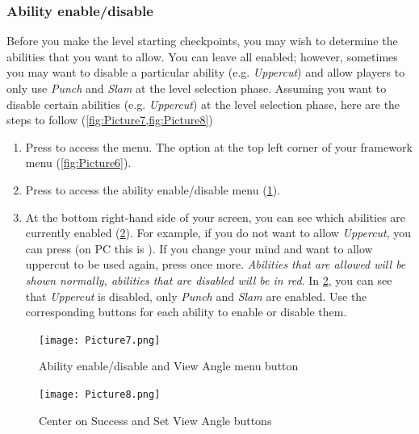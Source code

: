 \documentclass[12pt,a4paper]{article}
\begin{document}
        \subsubsection{Ability enable/disable}
            Before you make the level starting checkpoints, you may wish to determine the abilities that 
            you want to allow. You can leave all enabled; however, sometimes you may want to 
            disable a particular ability (e.g. \emph{Uppercut}) and allow players to only use \emph{Punch} and \emph{Slam} at 
            the level selection phase.
            Assuming you want to disable certain abilities (e.g. \emph{Uppercut}) at the level selection phase, here 
            are the steps to follow (\cref{fig:Picture7,fig:Picture8})
            \begin{enumerate}
              \item Press  to access the menu. The option at the top left corner of 
                    your framework menu (\cref{fig:Picture6}).
              \item Press  to access the ability enable/disable menu (\cref{fig:Picture7}).
              \item At the bottom right-hand side of your screen, you can see which abilities are currently 
                    enabled (\cref{fig:Picture8}). For example, if you do not want to allow \emph{Uppercut}, you can 
                    press  (on PC this is ). If you change your mind and want to allow uppercut to be used again, 
                    press  once more. \emph{Abilities that are allowed will be shown normally, abilities that 
                    are disabled will be in red}. In \cref{fig:Picture8}, you can see that \emph{Uppercut} is disabled, only 
                    \emph{Punch} and \emph{Slam} are enabled. Use the corresponding buttons for each ability to enable or disable them. 
    
            \end{enumerate}
    
        \begin{figure}[ht]
            \centering
            \texttt{[image: Picture7.png]}
            \caption{Ability enable/disable and View Angle menu button}
            \label{fig:Picture7}
        \end{figure}
    
        \begin{figure}[ht]
            \centering
            \texttt{[image: Picture8.png]}
            \caption{Center on Success and Set View Angle buttons}
            \label{fig:Picture8}
        \end{figure}
        \clearpage
    
\end{document}

